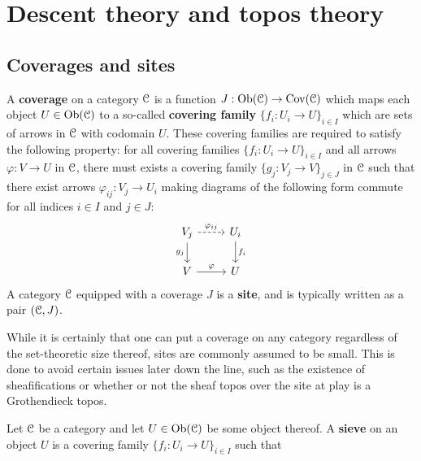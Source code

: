 \section{Descent theory and topos theory}
    \subsection{Coverages and sites}
        \begin{definition} \label{def: coverages_and_sites}
            A \textbf{coverage} on a category $\mathcal{C}$ is a function $J: \mathrm{Ob}(\mathcal{C}) \to \mathrm{Cov}(\mathcal{C})$ which maps each object $U \in \mathrm{Ob}(\mathcal{C})$ to a so-called \textbf{covering family} $\{f_i: U_i \to U\}_{i \in I}$ which are sets of arrows in $\mathcal{C}$ with codomain $U$. These covering families are required to satisfy the following property: for all covering families $\{f_i: U_i \to U\}_{i \in I}$ and all arrows $\varphi: V \to U$ in $\mathcal{C}$, there must exists a covering family $\{g_j: V_j \to V\}_{j \in J}$ in $\mathcal{C}$ such that there exist arrows $\varphi_{ij}: V_j \to U_i$ making diagrams of the following form commute for all indices $i \in I$ and $j \in J$:
                $$
                    \begin{tikzcd}
                    	{V_j} & {U_i} \\
                    	V & U
                    	\arrow["{f_i}", from=1-2, to=2-2]
                    	\arrow["\varphi", from=2-1, to=2-2]
                    	\arrow["{g_j}"', from=1-1, to=2-1]
                    	\arrow["{\varphi_{ij}}", dashed, from=1-1, to=1-2]
                    \end{tikzcd}
                $$
            A category $\mathcal{C}$ equipped with a coverage $J$ is a \textbf{site}, and is typically written as a pair $(\mathcal{C}, J)$.
        \end{definition}
        \begin{remark}
            While it is certainly that one can put a coverage on any category regardless of the set-theoretic size thereof, sites are commonly assumed to be small. This is done to avoid certain issues later down the line, such as the existence of sheafifications or whether or not the sheaf topos over the site at play is a Grothendieck topos.
        \end{remark}
        
        \begin{definition}[Sieves] \label{def: sieves}
            Let $\mathcal{C}$ be a category and let $U \in \mathrm{Ob}(\mathcal{C})$ be some object thereof. A \textbf{sieve} on an object $U$ is a covering family $\{f_i: U_i \to U\}_{i \in I}$ such that  
        \end{definition}
    
